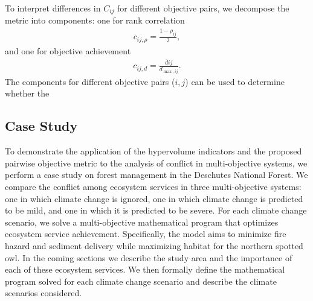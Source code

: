 To interpret differences in $C_{ij}$ for different objective pairs, we decompose the metric into components: one for rank correlation
\begin{align}
c_{ij,\rho} = \frac{1-\rho_{ij}}{2},
\end{align}
and one for objective achievement
\begin{align}
c_{ij,d} = \frac{\overbar{d}{ij}}{d_{\max,ij}}.
\end{align}
The components for different objective pairs ($i,j$) can be used to determine whether the 


\subsection{Case Study}
\label{sec:caseStudy}
To demonstrate the application of the hypervolume indicators and the proposed pairwise objective metric to the analysis of conflict in multi-objective systems, we perform a case study on forest management in the Deschutes National Forest. We compare the conflict among ecosystem services in three multi-objective systems: one in which climate change is ignored, one in which climate change is predicted to be mild, and one in which it is predicted to be severe. For each climate change scenario, we solve a multi-objective mathematical program that optimizes ecosystem service achievement. Specifically, the model aims to minimize fire hazard and sediment delivery while maximizing habitat for the northern spotted owl. In the coming sections we describe the study area and the importance of each of these ecosystem services. We then formally define the mathematical program solved for each climate change scenario and describe the climate scenarios considered.

